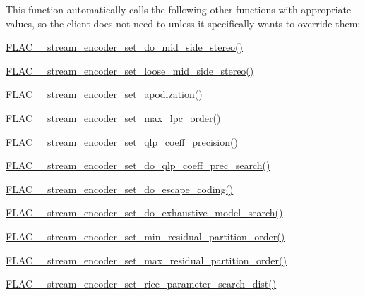 This function automatically calls the following other {} functions with appropriate values, so the client does not need to unless it specifically wants to override them\+:
\begin{DoxyItemize}
\item \hyperlink{group__flac__stream__encoder_gadbd1084da109cf0ddd007a5c64027504}{F\+L\+A\+C\+\_\+\+\_\+stream\+\_\+encoder\+\_\+set\+\_\+do\+\_\+mid\+\_\+side\+\_\+stereo()}
\item \hyperlink{group__flac__stream__encoder_ga7b7d294dccd5df7c6c67e75f59798f48}{F\+L\+A\+C\+\_\+\+\_\+stream\+\_\+encoder\+\_\+set\+\_\+loose\+\_\+mid\+\_\+side\+\_\+stereo()}
\item \hyperlink{group__flac__stream__encoder_ga83d38fd6fca7abbf8363bdc2536a299e}{F\+L\+A\+C\+\_\+\+\_\+stream\+\_\+encoder\+\_\+set\+\_\+apodization()}
\item \hyperlink{group__flac__stream__encoder_gac3bde5abdaa340674c5659e2e85d2611}{F\+L\+A\+C\+\_\+\+\_\+stream\+\_\+encoder\+\_\+set\+\_\+max\+\_\+lpc\+\_\+order()}
\item \hyperlink{group__flac__stream__encoder_ga0888d739c952ff73456bf90e48634514}{F\+L\+A\+C\+\_\+\+\_\+stream\+\_\+encoder\+\_\+set\+\_\+qlp\+\_\+coeff\+\_\+precision()}
\item \hyperlink{group__flac__stream__encoder_ga3aa94a1aec1cf40c37e54434c86bb50d}{F\+L\+A\+C\+\_\+\+\_\+stream\+\_\+encoder\+\_\+set\+\_\+do\+\_\+qlp\+\_\+coeff\+\_\+prec\+\_\+search()}
\item \hyperlink{group__flac__stream__encoder_gaa839d19b6d1b30ba0407d419bdb6fe67}{F\+L\+A\+C\+\_\+\+\_\+stream\+\_\+encoder\+\_\+set\+\_\+do\+\_\+escape\+\_\+coding()}
\item \hyperlink{group__flac__stream__encoder_ga7fbc05ec9abd249a400fccb9f189e55e}{F\+L\+A\+C\+\_\+\+\_\+stream\+\_\+encoder\+\_\+set\+\_\+do\+\_\+exhaustive\+\_\+model\+\_\+search()}
\item \hyperlink{group__flac__stream__encoder_gae3e2dd204f276d051bf1a118383bfda2}{F\+L\+A\+C\+\_\+\+\_\+stream\+\_\+encoder\+\_\+set\+\_\+min\+\_\+residual\+\_\+partition\+\_\+order()}
\item \hyperlink{group__flac__stream__encoder_ga6de153da5a8eeeb1be2271c27fa58b37}{F\+L\+A\+C\+\_\+\+\_\+stream\+\_\+encoder\+\_\+set\+\_\+max\+\_\+residual\+\_\+partition\+\_\+order()}
\item \hyperlink{group__flac__stream__encoder_ga668de93e7061bce21475c062ffab3e18}{F\+L\+A\+C\+\_\+\+\_\+stream\+\_\+encoder\+\_\+set\+\_\+rice\+\_\+parameter\+\_\+search\+\_\+dist()}
\end{DoxyItemize}


